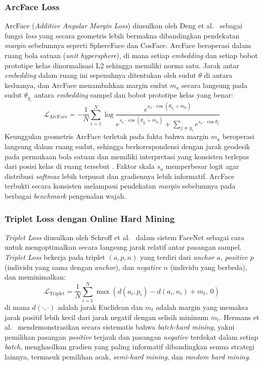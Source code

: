 \subsubsection{ArcFace Loss}
 
ArcFace (\textit{Additive Angular Margin Loss}) diusulkan oleh Deng et al.\ \cite{deng2019arcface} sebagai fungsi \textit{loss} yang secara geometris lebih bermakna dibandingkan pendekatan \textit{margin} sebelumnya seperti SphereFace dan CosFace. ArcFace beroperasi dalam ruang bola satuan (\textit{unit hypersphere}), di mana setiap \textit{embedding} dan setiap bobot prototipe kelas dinormalisasi L2 sehingga memiliki norma satu. Jarak antar \textit{embedding} dalam ruang ini sepenuhnya ditentukan oleh sudut $\theta$ di antara keduanya, dan ArcFace menambahkan margin sudut $m_a$ secara langsung pada sudut $\theta_{y_i}$ antara \textit{embedding} sampel dan bobot prototipe kelas yang benar:
\begin{equation}
    \mathcal{L}_{\text{ArcFace}}
    = -\frac{1}{N} \sum_{i=1}^{N}
      \log \frac{e^{s_a \cdot \cos(\theta_{y_i} + m_a)}}
                {e^{s_a \cdot \cos(\theta_{y_i} + m_a)}
                 + \displaystyle\sum_{j \neq y_i} e^{s_a \cdot \cos \theta_j}}
\end{equation}
Keunggulan geometris ArcFace terletak pada fakta bahwa margin $m_a$ beroperasi langsung dalam ruang sudut, sehingga berkorespondensi dengan jarak geodesik pada permukaan bola satuan dan memiliki interpretasi yang konsisten terlepas dari posisi kelas di ruang tersebut \cite{deng2019arcface}. Faktor skala $s_a$ memperbesar logit agar distribusi \textit{softmax} lebih terpusat dan gradiennya lebih informatif. ArcFace terbukti secara konsisten melampaui pendekatan \textit{margin} sebelumnya pada berbagai \textit{benchmark} pengenalan wajah.
 
\subsubsection{Triplet Loss dengan Online Hard Mining}
 
\textit{Triplet Loss} diusulkan oleh Schroff et al.\ \cite{schroff2015facenet} dalam sistem FaceNet sebagai cara untuk mengoptimalkan secara langsung jarak relatif antar pasangan sampel. \textit{Triplet Loss} bekerja pada triplet $(a, p, n)$ yang terdiri dari \textit{anchor} $a$, \textit{positive} $p$ (individu yang sama dengan \textit{anchor}), dan \textit{negative} $n$ (individu yang berbeda), dan meminimalkan:
\begin{equation}
    \mathcal{L}_{\text{Triplet}}
    = \frac{1}{N} \sum_{i=1}^{N}
      \max\!\left(d(a_i, p_i) - d(a_i, n_i) + m_t,\ 0\right)
\end{equation}
di mana $d(\cdot,\cdot)$ adalah jarak Euclidean dan $m_t$ adalah margin yang memaksa jarak positif lebih kecil dari jarak negatif dengan selisih minimum $m_t$. Hermans et al.\ \cite{hermans2017defense} mendemonstrasikan secara sistematis bahwa \textit{batch-hard mining}, yakni pemilihan pasangan \textit{positive} terjauh dan pasangan \textit{negative} terdekat dalam setiap \textit{batch}, menghasilkan gradien yang paling informatif dibandingkan semua strategi lainnya, termasuk pemilihan acak, \textit{semi-hard mining}, dan \textit{random hard mining}.
 
